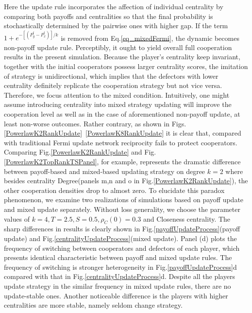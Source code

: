 \documentclass[preprint,12pt,3p]{elsarticle}
\begin{document}
    Here the update rule incorporates the affection of individual centrality by comparing both payoffs
and centralities so that the final probability is stochastically determined by the pairwise ones with higher gap.
    If the term $1+e^{-[(P_y^t-P_x^t)]/k}$ is removed from Eq.\ref{eq_mixedFermi},
the dynamic becomes non-payoff update rule.
Perceptibly, it ought to yield overall full cooperation results in the present simulation.
Because the player's centrality keep invariant, together with the initial cooperators possess larger centrality scores, the imitation of strategy is unidirectional, which implies that the defectors with lower
centrality definitely replicate the cooperation strategy but not vice versa.
Therefore, we focus attention to the mixed condition.
    Intuitively, one might assume introducing centrality into mixed strategy updating
will improve the cooperation level as well as in the case of aforementioned non-payoff update,
at least non-worse outcomes.
Rather contrary, as shown in Figs.\ref{PowerlawK2RankUpdate}~\ref{PowerlawK8RankUpdate} it is clear that, compared with traditional Fermi update network reciprocity fails to protect cooperators.
Comparing Fig.\ref{PowerlawK2RankUpdate} and Fig.\ref{PowerlawK2TopRankTSPanel},
for example, represents the dramatic difference between payoff-based and mixed-based updating strategy
on degree $k=2$ where besides centrality Degree(panels m,n and o in Fig.\ref{PowerlawK2RankUpdate}),
the other cooperation densities drop to almost zero.
    To elucidate this paradox phenomenon, we examine two realizations of simulations based on
payoff update and mixed update separately.
Without loss generality, we choose the parameter values of $k=4,T=2.5,S=0.5,\rho_{C}(0)=0.3$
and Closeness centrality.
    The sharp differences in results is clearly shown in Fig.\ref{payoffUpdateProcess}(payoff update)
and Fig.\ref{centralityUpdateProcess}(mixed update).
Panel (d) plots the frequency of switching between cooperators and defectors of each player,
which presents identical characteristic between payoff and mixed update rules.
The frequency of switching is stronger heterogeneity in Fig.\ref{payoffUpdateProcess}d compared with that in Fig.\ref{centralityUpdateProcess}d.
Despite all the players update strategy in the similar frequency in mixed update rules, there are no
update-stable ones.
    Another noticeable difference is the players with higher centralities are more stable, namely seldom change
strategy.
\end{document}
